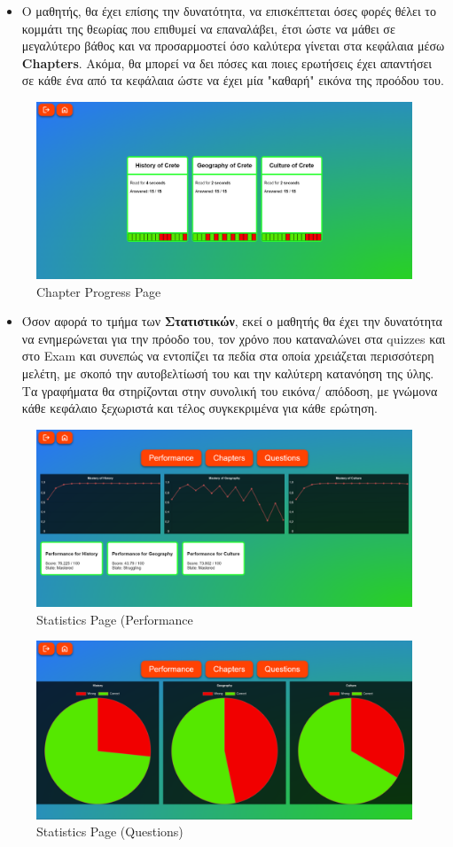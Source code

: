 \begin{itemize}
    \item Ο μαθητής, θα έχει επίσης την δυνατότητα, να επισκέπτεται όσες φορές θέλει το κομμάτι της θεωρίας που επιθυμεί να επαναλάβει, έτσι ώστε να μάθει σε μεγαλύτερο βάθος και να προσαρμοστεί όσο καλύτερα γίνεται στα κεφάλαια μέσω \textlatin{\textbf{Chapters}}. Ακόμα, θα μπορεί να δει πόσες και ποιες ερωτήσεις έχει απαντήσει σε κάθε ένα από τα κεφάλαια ώστε να έχει μία "καθαρή" εικόνα της προόδου του.
\end{itemize}
\begin{figure}[H]
    \centering
    \includegraphics[width=1\linewidth]{img/Chapter-Progress.png}
    \caption{\textlatin{Chapter Progress Page}}
\end{figure}

\begin{itemize}
    \item Όσον αφορά το τμήμα των \textbf{Στατιστικών}, εκεί ο μαθητής θα έχει την δυνατότητα να ενημερώνεται για την πρόοδο του, τον χρόνο που καταναλώνει στα \textlatin{quizzes} και στο \textlatin{Exam} και συνεπώς να εντοπίζει τα πεδία στα οποία χρειάζεται περισσότερη μελέτη, με σκοπό την αυτοβελτίωσή του και την καλύτερη κατανόηση της ύλης. Τα γραφήματα θα στηρίζονται στην συνολική του εικόνα/ απόδοση, με γνώμονα κάθε κεφάλαιο ξεχωριστά και τέλος συγκεκριμένα για κάθε ερώτηση.
\end{itemize}
\begin{figure}[H]
    \centering
    \includegraphics[width=0.5\linewidth]{img/Statistics.png}
    \caption{\textlatin{Statistics Page (Performance}}
\end{figure}
\begin{figure}[H]
    \centering
    \includegraphics[width=0.5\linewidth]{img/Statistics-Quests.png}
    \caption{\textlatin{Statistics Page (Questions)}}
\end{figure}